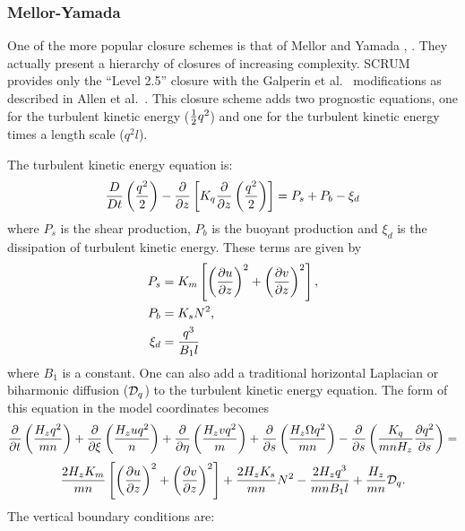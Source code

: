 \subsubsection{Mellor-Yamada}
One of the more popular closure schemes is that of Mellor and Yamada
\cite{Mellor74}, \cite{Mellor82}. They actually present a hierarchy of
closures of increasing complexity. SCRUM provides only the
``Level 2.5'' closure with the Galperin et al.\ \cite{Galperin88}
modifications as described in Allen et al.\ \cite{Allen95}.
This closure scheme adds two prognostic equations, one
for the turbulent kinetic energy (${1 \over 2} q^2$) and one for the
turbulent kinetic energy times a length scale ($q^2l$).

The turbulent kinetic energy equation is:
\begin{equation}
  {D \over Dt} \left( {q^2 \over 2} \right) -
  {\partial \over \partial z} \left[ K_q {\partial \over \partial z} 
  \left( {q^2 \over 2} \right) \right] = P_s + P_b - \xi_d
\end{equation}
where $P_s$ is the shear production, $P_b$ is the buoyant production
and $\xi_d$ is the dissipation of turbulent kinetic energy. 
These terms are given by
\begin{align}
   P_s &= K_m \left[ \left( {\partial u \over \partial z }\right)^2 +
   \left( {\partial v \over \partial z} \right)^2 \right],  \\
   P_b &= K_s N^2, \\
   \xi_d &= {q^3 \over B_1 l}
\end{align}
where $B_1$ is a constant.
One can also add a traditional horizontal Laplacian or biharmonic
diffusion (${\cal D}_q$) to the turbulent kinetic energy equation.
The form of this equation in the model coordinates becomes
{\samepage
\[
  {\partial \over \partial t} \left( {H_z q^2 \over mn} \right) +
  {\partial \over \partial \xi} \left( {H_z u q^2 \over n} \right) +
  {\partial \over \partial \eta} \left( {H_z v q^2 \over m} \right) +
  {\partial \over \partial s} \left( {H_z \Omega q^2 \over mn} \right) -
  {\partial \over \partial s} \left( {K_q \over mnH_z}
  {\partial q^2 \over \partial s} \right) =
\]
\begin{equation}
  {2H_z K_m \over mn} \left[ \left({\partial u \over \partial z}
  \right)^2 + \left( {\partial v \over \partial z} \right)^2 \right] +
  {2H_z K_s \over mn} N^2 - {2H_z q^3 \over mnB_1 l} +
  {H_z \over mn} {\cal D}_q .
\end{equation}
}
The vertical boundary conditions are:
